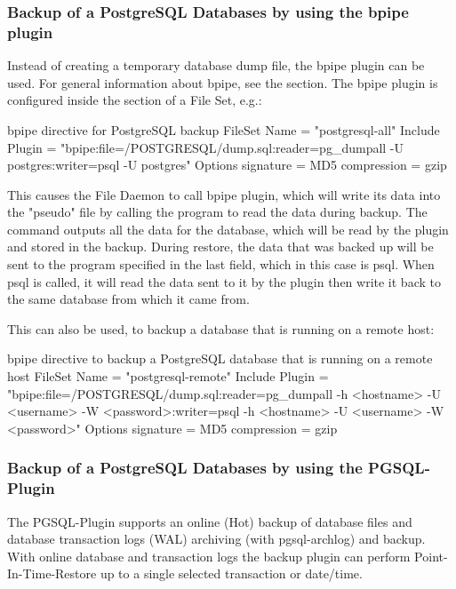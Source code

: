 \subsubsection{Backup of a PostgreSQL Databases by using the bpipe plugin}

Instead of creating a temporary database dump file,
the bpipe plugin can be used. 
For general information about bpipe, see the  section. 
The bpipe plugin is configured inside the  section of a File Set, e.g.:
\begin{bconfig}{bpipe directive for PostgreSQL backup}
FileSet {
  Name = "postgresql-all"
  Include {
    Plugin = "bpipe:file=/POSTGRESQL/dump.sql:reader=pg_dumpall -U postgres:writer=psql -U postgres"
    Options {
      signature = MD5
      compression = gzip
    }
  }
}
\end{bconfig}

This causes the File Daemon to call bpipe plugin, which will write its data into the "pseudo" file  by
calling the program  to read the data during backup. The  command outputs all 
the data for the database, which will be read by the plugin and stored in the backup. During restore, the data that was backed up will
be sent to the program specified in the last field, which in this case is psql. When psql is called, it will read the data sent to it by 
the plugin then write it back to the same database from which it came from.

This can also be used, to backup a database that is running on a remote host:
\begin{bconfig}{bpipe directive to backup a PostgreSQL database that is running on a remote host}
FileSet {
  Name = "postgresql-remote"
  Include {
    Plugin = "bpipe:file=/POSTGRESQL/dump.sql:reader=pg_dumpall -h <hostname> -U <username> -W <password>:writer=psql -h <hostname> -U <username> -W <password>"
    Options {
      signature = MD5
      compression = gzip
    }
  }
}
\end{bconfig}

\subsubsection{Backup of a PostgreSQL Databases by using the PGSQL-Plugin}
\label{backup-postgresql-plugin}

The PGSQL-Plugin supports an online (Hot) backup of database files and database transaction logs (WAL) archiving (with pgsql-archlog) and backup. With online database and transaction logs the backup plugin can perform Point-In-Time-Restore up to a single selected transaction or date/time. 

